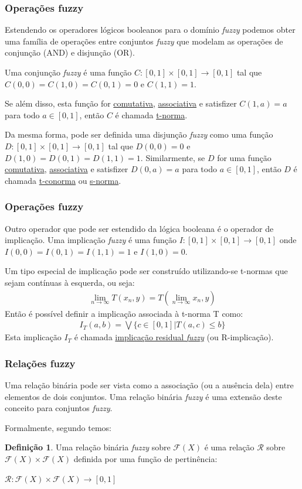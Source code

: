 \documentclass{beamer}
\theoremstyle{definition}
\newtheorem{defi}{Definição}
\begin{document}
\begin{frame}
\frametitle{Operações fuzzy}
Estendendo os operadores lógicos booleanos para o domínio \textit{fuzzy} podemos obter uma família de operações entre conjuntos \textit{fuzzy} que modelam as operações de conjunção (AND) e disjunção (OR)\cite{p6}\cite{p5}.\par
Uma conjunção \textit{fuzzy} é uma função $C:[0,1] \times [0,1] \rightarrow [0,1]$ tal que $C(0,0) = C(1,0) = C(0,1) = 0$ e $C(1,1) = 1$.\par
Se além disso, esta função for \underline{comutativa}, \underline{associativa} e satisfizer $C(1,a) = a$ para todo $a \in [0,1]$, então $C$ é chamada \underline{t-norma}.\par
Da mesma forma, pode ser definida uma disjunção \textit{fuzzy} como uma função $D:[0,1] \times [0,1] \rightarrow [0,1]$ tal que $D(0,0) = 0$ e $D(1,0) = D(0,1) = D(1,1) = 1$. Similarmente, se $D$ for uma função \underline{comutativa}, \underline{associativa} e satisfizer $D(0,a) = a$ para todo $a \in [0,1]$, então $D$ é chamada \underline{t-conorma} ou \underline{s-norma}.\par
\end{frame}

\begin{frame}
\frametitle{Operações fuzzy}
Outro operador que pode ser estendido da lógica booleana é o operador de implicação. Uma implicação \textit{fuzzy} é uma função $I:[0,1] \times [0,1] \rightarrow [0,1]$ onde $I(0,0) = I(0,1) = I(1,1) = 1$ e $I(1,0) = 0$.\par
Um tipo especial de implicação pode ser construído utilizando-se t-normas que sejam contínuas à esquerda, ou seja:
\begin{align*}
\lim_{n\to\infty} T(x_{n},y) = T(\lim_{n\to\infty} x_{n},y) 
\end{align*}
Então é possível definir a implicação associada à t-norma T como:
\begin{align*}
I_{T}(a,b) = \bigvee \{c \in [0,1]|T(a,c) \leq b\}
\end{align*}
Esta implicação $I_{T}$ é chamada \underline{implicação residual \textit{fuzzy}} (ou R-implicação).
\end{frame}

\begin{frame}
\frametitle{Relações fuzzy}
Uma relação binária pode ser vista como a associação (ou a ausência dela) entre elementos de dois conjuntos. Uma relação binária \textit{fuzzy} é uma extensão deste conceito para conjuntos \textit{fuzzy}.\par
Formalmente, segundo \cite{p3} temos:
\begin{defi}
Uma relação binária \textit{fuzzy} sobre $\mathcal{F}(X)$ é uma relação $\mathcal{R}$ sobre $\mathcal{F}(X)\times\mathcal{F}(X)$ definida por uma função de pertinência:
\begin{center}
$\mathcal{R}:\mathcal{F}(X)\times\mathcal{F}(X) \rightarrow [0,1]$
\end{center}
\end{defi}
\end{frame}
\end{document}
